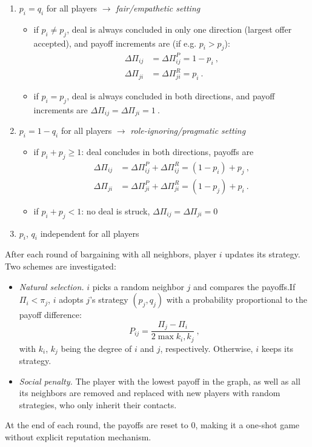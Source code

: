 \begin{enumerate}[label=(\alph*)]
	\item $p_i = q_i$ for all players $\rightarrow$ \emph{fair/empathetic setting} \label{it:fair_setting}
	\begin{itemize}
		\item if $p_i \neq p_j$, deal is always concluded in only one direction (largest offer accepted), and payoff increments are (if e.g. $p_i>p_j$):
		\begin{align}
			\Delta\Pi_{ij} &= \Delta\Pi_{ij}^P = 1-p_i \ ,\\
			\Delta\Pi_{ji} &= \Delta\Pi_{ji}^R = p_i \ .
		\end{align}
		\item if $p_i = p_j$, deal is always concluded in both directions, and payoff increments are $\Delta\Pi_{ij} = \Delta\Pi_{ji} = 1 \ .$
	\end{itemize}
	\item $p_i = 1- q_i$ for all players $\rightarrow$ \emph{role-ignoring/pragmatic setting}\label{it:pragmatic_setting}
	\begin{itemize}
		\item if $p_i + p_j \geq 1$: deal concludes in both directions, payoffs are 
		\begin{align}
			\Delta\Pi_{ij} &= \Delta\Pi_{ij}^P + \Delta\Pi_{ij}^R = (1-p_i) + p_j \ ,\\
			\Delta\Pi_{ji} &= \Delta\Pi_{ji}^P + \Delta\Pi_{ji}^R = (1-p_j) + p_i  \ .
		\end{align}
		\item if $p_i + p_j < 1$: no deal is struck, $\Delta\Pi_{ij} = \Delta\Pi_{ji} = 0$
	\end{itemize}
	\item $p_i$, $q_i$ independent for all players \label{it:indep_setting}
\end{enumerate}
After each round of bargaining with all neighbors, player $i$ updates its strategy. Two schemes are investigated:
\begin{itemize}
	\item \emph{Natural selection.} $i$ picks a random neighbor $j$ and compares the payoffs.If $\Pi_i < \pi_j$, $i$ adopts $j$'s strategy $(p_j, q_j)$ with a probability proportional to the payoff difference: 
	\begin{equation}
		P_{ij} = \frac{\Pi_j - \Pi_i}{2\max{k_i, k_j}} \ ,
	\end{equation}
	with $k_i$, $k_j$ being the degree of $i$ and $j$, respectively. Otherwise, $i$ keeps its strategy.
	\item \emph{Social penalty.} The player with the lowest payoff in the graph, as well as all its neighbors are removed and replaced with new players with random strategies, who only inherit their contacts.
\end{itemize}
At the end of each round, the payoffs are reset to 0, making it a one-shot game without explicit reputation mechanism.
%
